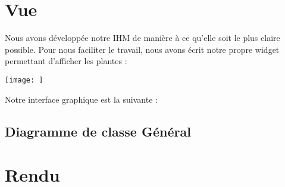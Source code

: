 \documentclass[a4paper,10pt]{article}
\begin{document}
\section{Vue}

Nous avons développée notre IHM de manière à ce qu'elle soit le plus claire possible.
Pour nous faciliter le travail, nous avons écrit notre propre widget permettant d'afficher les plantes :

\texttt{[image: ]}

Notre interface graphique est la suivante :
\subsection{Diagramme de classe Général}
\section{Rendu}
\end{document}
